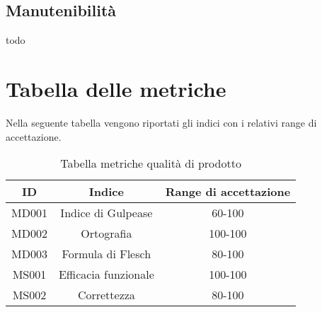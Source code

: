 \subsection{Manutenibilità}
todo
\section{Tabella delle metriche}
Nella seguente tabella vengono riportati gli indici con i relativi range di accettazione.\\
\begin{table}[h]
    \begin{center}
      \begin{tabular}{|c|c|c|}
        \hline
        \textbf{ID} & \textbf{Indice}       & \textbf{Range di accettazione}\\
        \hline
        MD001       & Indice di Gulpease    & 60-100\\
        MD002       & Ortografia            & 100-100\\
        MD003       & Formula di Flesch     & 80-100\\\hline
        MS001       & Efficacia funzionale  & 100-100\\
        MS002       & Correttezza  			& 80-100\\
            
        \hline
      \end{tabular}
      \caption{Tabella metriche qualità di prodotto}
    \end{center}
\end{table}